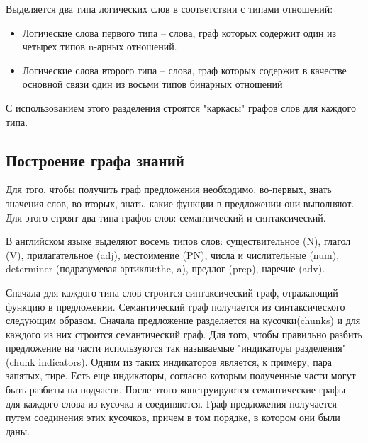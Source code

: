 Выделяется два типа логических слов в соответствии с типами отношений:

\begin{itemize}

\item{
Логические слова первого типа – слова, граф которых содержит один из четырех типов n-арных отношений.
}

\item{
Логические слова второго типа – слова, граф которых содержит в качестве основной связи один из восьми типов 
бинарных отношений
}
\end {itemize}

С использованием этого разделения строятся "каркасы" графов слов для каждого типа. 

\subsection {Построение графа знаний}
Для того, чтобы получить граф предложения необходимо, во-первых,  знать значения слов,
во-вторых, знать, какие функции в предложении они выполняют. Для этого строят два типа графов
слов: семантический и синтаксический.

В английском языке выделяют восемь типов слов: существительное (N), глагол (V), прилагательное (adj),
местоимение (PN),  числа и числительные (num), determiner (подразумевая артикли:the, a), предлог (prep),
наречие (adv).

Сначала для каждого типа слов строится синтаксический граф, отражающий функцию в предложении.
Семантический граф получается из синтаксического следующим образом. Сначала предложение
разделяется на кусочки(chunks) и для каждого из них строится семантический граф. Для того,
чтобы правильно разбить предложение на части используются так называемые "индикаторы разделения"
(chunk indicators). Одним из таких индикаторов является, к примеру, пара запятых, тире. Есть еще 
индикаторы, согласно которым полученные части могут быть разбиты на подчасти.
После этого конструируются семантические графы для каждого слова из кусочка и соединяются.
Граф предложения получается путем соединения этих кусочков, причем в том порядке, в котором
они были даны.
